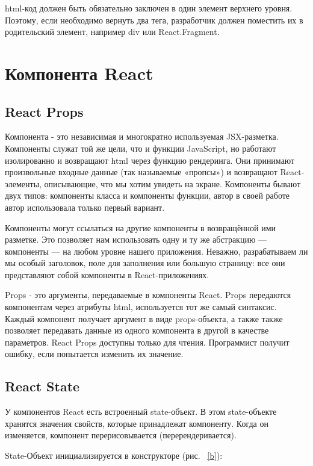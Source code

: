 \documentclass[a4paper,12pt]{diplom}
\begin{document}
html-код должен быть обязательно заключен в один элемент верхнего уровня.
Поэтому, если необходимо вернуть два тега, разработчик должен поместить их в родительский элемент, например div или React.Fragment.
\section{Компонента React}

\subsection{React Props}

Компонента - это независимая и многократно используемая JSX-разметка. Компоненты служат той же цели, что и функции JavaScript, но работают изолированно и возвращают html через функцию рендеринга. Они принимают произвольные входные данные (так называемые «пропсы») и возвращают React-элементы, описывающие, что мы хотим увидеть на экране.
Компоненты бывают двух типов: компоненты класса и компоненты функции, автор в своей работе автор использовала только первый вариант.

Компоненты могут ссылаться на другие компоненты в возвращённой ими разметке. Это позволяет нам использовать одну и ту же абстракцию — компоненты — на любом уровне нашего приложения. Неважно, разрабатываем ли мы особый заголовок, поле для заполнения или большую страницу: все они представляют собой компоненты в React-приложениях.

Props - это аргументы, передаваемые в компоненты React.
Props передаются компонентам через атрибуты html, используется тот же самый синтаксис. Каждый компонент получает аргумент в виде props-объекта, а также также позволяет передавать данные из одного компонента в другой в качестве параметров. React Props доступны только для чтения. Программист получит ошибку, если попытается изменить их значение.

\subsection{React State}
У компонентов React есть встроенный state-объект.
В этом state-объекте хранятся значения свойств, которые принадлежат компоненту.
Когда он изменяется, компонент перерисовывается (перерендеривается).

State-Объект инициализируется в конструкторе (рис. ~\ref{b}):
\end{document}
